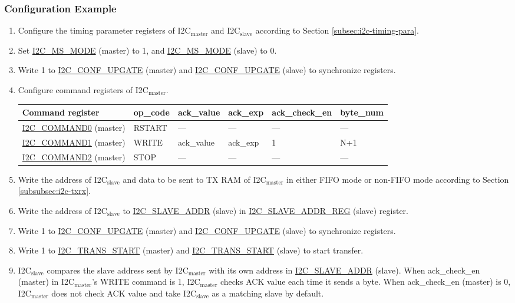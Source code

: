 \documentclass[main\_\_EN.tex]{subfiles}
\begin{document}
\subsubsection{Configuration Example}
\begin{enumerate}
\item Configure the timing parameter registers of I2C$_\text{master}$ and I2C$_\text{slave}$ according to Section \ref{subsec:i2c-timing-para}.
\item Set \hyperref[fielddesc:I2CMSMODE]{I2C\_MS\_MODE} (master) to 1, and \hyperref[fielddesc:I2CMSMODE]{I2C\_MS\_MODE} (slave) to 0.
\item Write 1 to \hyperref[fielddesc:I2CCONFUPGATE]{I2C\_CONF\_UPGATE} (master) and \hyperref[fielddesc:I2CCONFUPGATE]{I2C\_CONF\_UPGATE} (slave) to synchronize registers.
\item Configure command registers of I2C$_\text{master}$.
\begin{longtable}{ | p{4cm} | p{2cm} | p{2cm} | p{2cm} |p{2cm} | p{2cm} |}
\hline\rowcolor{lightgray}
Command register& op\_code & ack\_value&ack\_exp&ack\_check\_en&byte\_num  \\ \hline
\hyperref[fielddesc:I2CCOMMAND0]{I2C\_COMMAND0} (master)& RSTART& ---&---&---&---  \\ \hline
\hyperref[fielddesc:I2CCOMMAND1]{I2C\_COMMAND1} (master)& WRITE& ack\_value&ack\_exp&1&N+1  \\ \hline
\hyperref[fielddesc:I2CCOMMAND2]{I2C\_COMMAND2} (master)& STOP& ---&---&---&---  \\ \hline
\end{longtable}
\item Write the address of I2C$_\text{slave}$ and data to be sent to TX RAM of I2C$_\text{master}$ in either FIFO mode or non-FIFO mode according to Section \ref{subsubsec:i2c-txrx}.
\item Write the address of I2C$_\text{slave}$ to \hyperref[fielddesc:I2CSLAVEADDR]{I2C\_SLAVE\_ADDR} (slave) in \hyperref[regdesc:I2CSLAVEADDRREG]{I2C\_SLAVE\_ADDR\_REG} (slave) register.
\item Write 1 to \hyperref[fielddesc:I2CCONFUPGATE]{I2C\_CONF\_UPGATE} (master) and \hyperref[fielddesc:I2CCONFUPGATE]{I2C\_CONF\_UPGATE} (slave) to synchronize registers.
\item Write 1 to \hyperref[fielddesc:I2CTRANSSTART]{I2C\_TRANS\_START} (master) and \hyperref[fielddesc:I2CTRANSSTART]{I2C\_TRANS\_START} (slave) to start transfer.
\item I2C$_\text{slave}$ compares the slave address sent by I2C$_\text{master}$ with its own address in \hyperref[fielddesc:I2CSLAVEADDR]{I2C\_SLAVE\_ADDR} (slave). When ack\_check\_en (master) in I2C$_\text{master}$'s WRITE command is 1, I2C$_\text{master}$ checks ACK value each time it sends a byte. When ack\_check\_en (master) is 0, I2C$_\text{master}$ does not check ACK value and take I2C$_\text{slave}$ as a matching slave by default.

\end{enumerate}
\end{document}
